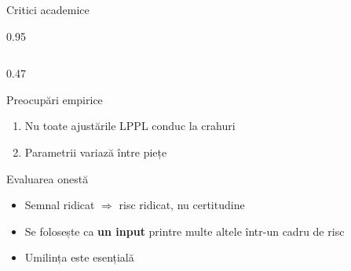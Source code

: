 \documentclass[9pt, aspectratio=169, t]{beamer}
\begin{document}
\begin{frame}{Critici academice}
\begin{cminipage}{0.95\textwidth}
{\begin{columns}[T]
\begin{column}{0.47\textwidth}
\begin{alertblock}{Preocupări empirice}
\begin{enumerate}
                    \item Nu toate ajustările LPPL conduc la crahuri
                    \item Parametrii variază între piețe
                \end{enumerate}
            \end{alertblock}
            \vspace{-2mm}
            \begin{block}{Evaluarea onestă}
                \begin{itemize}\setlength{\itemsep}{0pt}
                    \item Semnal ridicat $\Rightarrow$ risc ridicat, nu certitudine
                    \item Se folosește ca \textbf{un input} printre multe altele într-un cadru de risc
                    \item Umilința este esențială
                \end{itemize}
            \end{block}
        \end{column}
    \end{columns}
    }
    \end{cminipage}
\end{frame}
\end{document}
